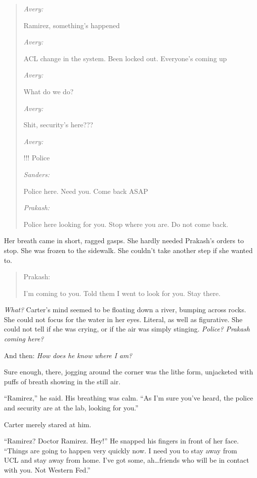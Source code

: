 \begin{quote}
\emph{Avery:}

Ramirez, something's happened

\emph{Avery:}

ACL change in the system. Been locked out. Everyone's coming up

\emph{Avery:}

What do we do?

\emph{Avery:}

Shit, security's here???

\emph{Avery:}

!!! Police

\emph{Sanders:}

Police here. Need you. Come back ASAP

\emph{Prakash:}

Police here looking for you. Stop where you are. Do not come back.
\end{quote}

Her breath came in short, ragged gasps. She hardly needed Prakash's orders to stop. She was frozen to the sidewalk. She couldn't take another step if she wanted to.

\begin{quote}
Prakash:

I'm coming to you. Told them I went to look for you. Stay there.
\end{quote}

\emph{What?} Carter's mind seemed to be floating down a river, bumping across rocks. She could not focus for the water in her eyes. Literal, as well as figurative. She could not tell if she was crying, or if the air was simply stinging. \emph{Police? Prakash coming here?}

And then: \emph{How does he know where I am?}

Sure enough, there, jogging around the corner was the lithe form, unjacketed with puffs of breath showing in the still air.

``Ramirez,'' he said. His breathing was calm. ``As I'm sure you've heard, the police and security are at the lab, looking for you.''

Carter merely stared at him.

``Ramirez? Doctor Ramirez. Hey!'' He snapped his fingers in front of her face. ``Things are going to happen very quickly now. I need you to stay away from UCL and stay away from home. I've got some, ah\ldots{}friends who will be in contact with you. Not Western Fed.''

